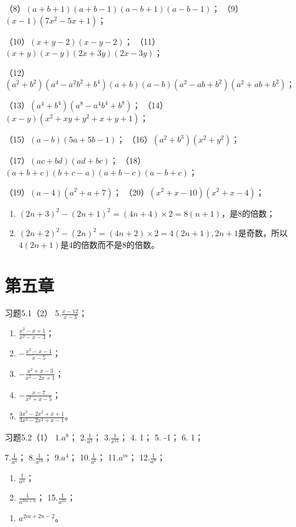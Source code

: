 （8）\((a + b + 1)(a + b - 1)(a - b + 1)(a - b - 1)\)；
（9）\((x - 1)(7x^2 - 5x + 1)\)；

（10）\((x + y - 2)(x - y - 2)\)；
（11）\((x + y)(x - y)(2x + 3y)(2x - 3y)\)；

（12）\((a^2 + b^2)(a^4 - a^2b^2 + b^4)(a + b)(a - b)(a^2 - ab + b^2)(a^2 + ab + b^2)\)；

（13）\((a^4 + b^4)(a^8 - a^4b^4 + b^8)\)；
（14）\((x - y)(x^2 + xy + y^2 + x + y + 1)\)；

（15）\((a - b)(5a + 5b - 1)\)； （16）\((a^2 + b^3)(x^2 + y^2)\)；

（17）\((ac + bd)(ad + bc)\)；
（18）\((a + b + c)(b + c - a)(a + b - c)(a - b + c)\)；

（19）\((a - 4)(a^2 + a + 7)\)； （20）\((x^2 + x - 10)(x^2 + x - 4)\)；

\begin{enumerate}[start=2]
\item
  \((2n + 3)^{2} - (2n + 1)^{2} = (4n + 4)\times 2 = 8(n + 1)\)，是8的倍数；
\item
  \((2n + 2)^{2} - (2n)^{2} = (4n + 2) \times 2 = 4(2n + 1), 2n + 1\)是奇数，所以\(4(2n + 1)\)是4的倍数而不是8的倍数。
\end{enumerate}

\section{第五章}

习题5.1（2） 5.\(\frac{x - 12}{x - 3}\)；
\begin{enumerate}[start=6]
\item
  \(\frac{x^2 - x + 1}{x^2 - x - 3}\)；
\item
  \(-\frac{x^2 - x - 1}{x - 5}\)；
\item
  \(-\frac{x^2 + x - 3}{x^2 - 2x + 1}\)；
\item
  \(-\frac{x - 7}{x^2 + x - 5}\)；
\item
  \(\frac{3x^3 - 2x^2 + x + 1}{3x^3 - 2x^2 + x - 1}\)。
\end{enumerate}

习题5.2（1） 1.\(a^8\)； 2.\(\frac{1}{a^3}\)； 3.\(\frac{1}{x^{12}}\)；
4. 1； 5. -1； 6. 1；

7.\(\frac{1}{a^3}\)； 8.\(\frac{1}{a^{18}}\)； 9.\(a^4\)；
10.\(\frac{1}{a^6}\)； 11.\(a^m\)； 12.\(\frac{1}{a^n}\)；
\begin{enumerate}[start=13]
\item
  \(\frac{1}{a^n}\)；
\item
  \(\frac{1}{a^{3m+n}}\)； 15.\(\frac{1}{a^{2n}}\)；
\end{enumerate}
\begin{enumerate}[start=16]
\item
  \(a^{2m+2n-2}\)。
\end{enumerate}

